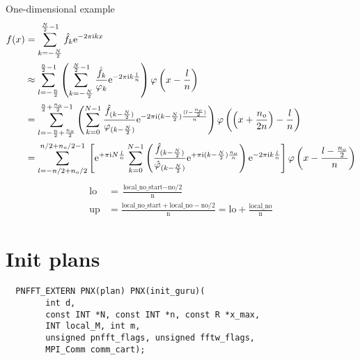 \documentclass[a4paper,11pt,final,openright,headsepline]{scrreprt}
\numberwithin{figure}{chapter}
\numberwithin{table}{chapter}
\numberwithin{equation}{chapter}
\begin{document}
One-dimensional example
\begin{align*}
  f(x)
  &=
    \sum_{k=-\frac{N}{2}}^{\frac{N}{2}-1} \hat f_k \mathrm{e}^{-2\pi{\ensuremath{\text{\scriptsize{i}}}} kx} \\
  &\approx
    \sum_{l=-\frac{n}{2}}^{\frac{n}{2}-1}\left( \sum_{k=-\frac{N}{2}}^{\frac{N}{2}-1} \frac{\hat f_k}{\varphi_k} \mathrm{e}^{-2\pi{\ensuremath{\text{\scriptsize{i}}}} k\frac{l}{n}} \right) \varphi\left(x-\frac{l}{n}\right) \\
  &=
    \sum_{l=-\frac{n}{2}+\frac{n_o}{2}}^{\frac{n}{2}+\frac{n_o}{2}-1} \left(
      \sum_{k=0}^{N-1} \frac{\hat f_{(k-\frac{N}{2})}}{\varphi_{(k-\frac{N}{2})}} \mathrm{e}^{-2\pi{\ensuremath{\text{\scriptsize{i}}}} (k-\frac{N}{2})\frac{(l-\frac{n_o}{2})}{n}}
    \right) \varphi\left( \left(x+\frac{n_o}{2n}\right)-\frac{l}{n}\right) \\
  &=
    \sum_{l=-n/2+n_o/2}^{n/2+n_o/2-1} \left[
      {\mathrm{e}}^{+\pi\text{\scriptsize{i}} N\frac{l}{n}} \sum_{k=0}^{N-1} \left(
        \frac{\hat f_{(k-\frac{N}{2})}}{\hat\varphi_{(k-\frac{N}{2})}}
        {\mathrm{e}}^{+\pi\text{\scriptsize{i}}(k-\frac{N}{2})\frac{n_o}{n}}
      \right)
      \mathrm{e}^{-2\pi{\ensuremath{\text{\scriptsize{i}}}} k\frac{l}{n}}
    \right] \varphi\left( x-\frac{l-\frac{n_o}{2}}{n} \right)
\end{align*}
\begin{align*}
  \textrm{lo}
  &=
    \frac{\textrm{local\_no\_start} - \textrm{no/2}}{\textrm{n}} \\
  \textrm{up}
  &=
    \frac{\textrm{local\_no\_start} + \textrm{local\_no} - \textrm{no/2}}{\textrm{n}}
  =
    \textrm{lo} + \frac{\textrm{local\_no}}{\textrm{n}}
\end{align*}



\section{Init plans}

\begin{lstlisting}
  PNFFT_EXTERN PNX(plan) PNX(init_guru)(
        int d,
        const INT *N, const INT *n, const R *x_max,
        INT local_M, int m,
        unsigned pnfft_flags, unsigned fftw_flags,
        MPI_Comm comm_cart);
\end{lstlisting}
\end{document}
